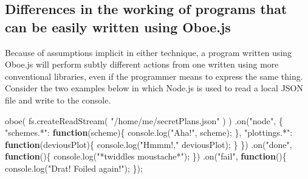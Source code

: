 \documentclass[12pt, ]{article}
\newenvironment{Shaded}{}{}
\newcommand{\KeywordTok}[1]{\textcolor[rgb]{0.00,0.44,0.13}{\textbf{{#1}}}}
\newcommand{\StringTok}[1]{\textcolor[rgb]{0.25,0.44,0.63}{{#1}}}
\newcommand{\OtherTok}[1]{\textcolor[rgb]{0.00,0.44,0.13}{{#1}}}
\newcommand{\FunctionTok}[1]{\textcolor[rgb]{0.02,0.16,0.49}{{#1}}}
\newcommand{\NormalTok}[1]{{#1}}
\begin{document}
\subsection{Differences in the working of programs that can be easily
written using
Oboe.js}\label{differences-in-the-working-of-programs-that-can-be-easily-written-using-oboe.js}

Because of assumptions implicit in either technique, a program written
using Oboe.js will perform subtly different actions from one written
using more conventional libraries, even if the programmer means to
express the same thing. Consider the two examples below in which Node.js
is used to read a local JSON file and write to the console.

\begin{Shaded}
\begin{Highlighting}[]
\FunctionTok{oboe}\NormalTok{( }\OtherTok{fs}\NormalTok{.}\FunctionTok{createReadStream}\NormalTok{( }\StringTok{"/home/me/secretPlans.json"} \NormalTok{) )}
   \NormalTok{.}\FunctionTok{on}\NormalTok{(}\StringTok{"node"}\NormalTok{, \{}
      \StringTok{"schemes.*"}\NormalTok{: }\KeywordTok{function}\NormalTok{(scheme)\{}
         \OtherTok{console}\NormalTok{.}\FunctionTok{log}\NormalTok{(}\StringTok{"Aha!"}\NormalTok{, scheme);}
      \NormalTok{\},}
      \StringTok{"plottings.*"}\NormalTok{: }\KeywordTok{function}\NormalTok{(deviousPlot)\{}
         \OtherTok{console}\NormalTok{.}\FunctionTok{log}\NormalTok{(}\StringTok{"Hmmm!,"} \NormalTok{deviousPlot);}
      \NormalTok{\}   }
   \NormalTok{\})}
   \NormalTok{.}\FunctionTok{on}\NormalTok{(}\StringTok{"done"}\NormalTok{, }\KeywordTok{function}\NormalTok{()\{}
      \OtherTok{console}\NormalTok{.}\FunctionTok{log}\NormalTok{(}\StringTok{"*twiddles moustache*"}\NormalTok{);}
   \NormalTok{\})}
   \NormalTok{.}\FunctionTok{on}\NormalTok{(}\StringTok{"fail"}\NormalTok{, }\KeywordTok{function}\NormalTok{()\{}
      \OtherTok{console}\NormalTok{.}\FunctionTok{log}\NormalTok{(}\StringTok{"Drat! Foiled again!"}\NormalTok{);   }
   \NormalTok{\});}
\end{Highlighting}
\end{Shaded}
\end{document}
